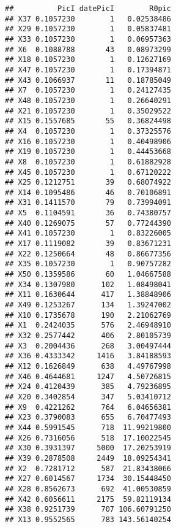 \documentclass[
]{article}
\begin{document}
\begin{verbatim}
##          PicI datePicI        R0pic
## X37 0.1057230        1   0.02538486
## X29 0.1057230        1   0.05837481
## X33 0.1057230        1   0.06957363
## X6  0.1088788       43   0.08973299
## X18 0.1057230        1   0.12627169
## X47 0.1057230        1   0.17394871
## X43 0.1066937       11   0.18785049
## X7  0.1057230        1   0.24127435
## X48 0.1057230        1   0.26640291
## X21 0.1057230        1   0.35029522
## X15 0.1557685       55   0.36824498
## X4  0.1057230        1   0.37325576
## X16 0.1057230        1   0.40498906
## X19 0.1057230        1   0.44453668
## X8  0.1057230        1   0.61882928
## X45 0.1057230        1   0.67120222
## X25 0.1212751       39   0.68074922
## X14 0.1095486       46   0.70106891
## X31 0.1411570       79   0.73994091
## X5  0.1104591       36   0.74380757
## X40 0.1269075       57   0.77244390
## X41 0.1057230        1   0.83226005
## X17 0.1119082       39   0.83671231
## X22 0.1250664       48   0.86677356
## X35 0.1057230        1   0.90757282
## X50 0.1359586       60   1.04667588
## X34 0.1307980      102   1.08498041
## X11 0.1630644      417   1.38848906
## X49 0.1253267      134   1.39247002
## X10 0.1735678      190   2.21062769
## X1  0.2424035      576   2.46948910
## X32 0.2577442      406   2.80105739
## X3  0.2004436      268   3.00497444
## X36 0.4333342     1416   3.84188593
## X12 0.1626849      638   4.49767998
## X46 0.4644681     1247   4.50726815
## X24 0.4120439      385   4.79236895
## X20 0.3402854      347   5.03410712
## X9  0.4221262      764   6.04656381
## X23 0.3790083      655   6.70477493
## X44 0.5991545      718  11.99219800
## X26 0.7316056      518  17.10022545
## X30 0.3931397     5000  17.20253919
## X39 0.2878508     2449  18.09254341
## X2  0.7281712      587  21.83438066
## X27 0.6014567     1734  30.15448450
## X28 0.8562673      692  41.00530859
## X42 0.6056611     2175  59.82119134
## X38 0.9251739      707 106.60791250
## X13 0.9552565      783 143.56140254
\end{verbatim}
\end{document}
